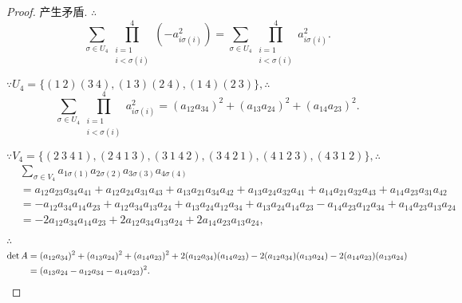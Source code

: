 \documentclass{ctexart}
\begin{document}
\begin{proof}
    产生矛盾. $\therefore$
    \[\sum\limits_{\sigma\in U_4}\prod\limits_{\substack{i=1\\i<\sigma(i)}}^4(-a_{i\sigma(i)}^2)=\sum\limits_{\sigma\in U_4}\prod\limits_{\substack{i=1\\i<\sigma(i)}}^4a_{i\sigma(i)}^2.\]

    $\because U_4=\{(1\ 2)(3\ 4),(1\ 3)(2\ 4),(1\ 4)(2\ 3)\},\therefore$
    \[\sum\limits_{\sigma\in U_4}\prod\limits_{\substack{i=1\\i<\sigma(i)}}^4a_{i\sigma(i)}^2=(a_{12}a_{34})^2+(a_{13}a_{24})^2+(a_{14}a_{23})^2.\]

    $\because V_4=\{(2\ 3\ 4\ 1),(2\ 4\ 1\ 3),(3\ 1\ 4\ 2),(3\ 4\ 2\ 1),(4\ 1\ 2\ 3),(4\ 3\ 1\ 2)\},\therefore$
    \begin{align*}
        & \sum\limits_{\sigma\in V_4}a_{1\sigma(1)}a_{2\sigma(2)}a_{3\sigma(3)}a_{4\sigma(4)} \\
        & =a_{12}a_{23}a_{34}a_{41}+a_{12}a_{24}a_{31}a_{43}+a_{13}a_{21}a_{34}a_{42}+a_{13}a_{24}a_{32}a_{41}+a_{14}a_{21}a_{32}a_{43}+a_{14}a_{23}a_{31}a_{42} \\
        & =-a_{12}a_{34}a_{14}a_{23}+a_{12}a_{34}a_{13}a_{24}+a_{13}a_{24}a_{12}a_{34}+a_{13}a_{24}a_{14}a_{23}-a_{14}a_{23}a_{12}a_{34}+a_{14}a_{23}a_{13}a_{24} \\
        & =-2a_{12}a_{34}a_{14}a_{23}+2a_{12}a_{34}a_{13}a_{24}+2a_{14}a_{23}a_{13}a_{24},
    \end{align*}

    $\therefore$
    \begin{align*}
        \det A & =(a_{12}a_{34})^2+(a_{13}a_{24})^2+(a_{14}a_{23})^2+2(a_{12}a_{34})(a_{14}a_{23})-2(a_{12}a_{34})(a_{13}a_{24})-2(a_{14}a_{23})(a_{13}a_{24}) \\
        & =(a_{13}a_{24}-a_{12}a_{34}-a_{14}a_{23})^2.\qedhere
    \end{align*}
\end{proof}
\end{document}
